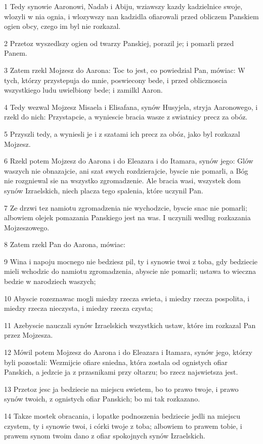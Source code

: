 \par 1 Tedy synowie Aaronowi, Nadab i Abiju, wziawszy kazdy kadzielnice swoje, wlozyli w nia ognia, i wlozywszy nan kadzidla ofiarowali przed obliczem Panskiem ogien obcy, czego im byl nie rozkazal.
\par 2 Przetoz wyszedlszy ogien od twarzy Panskiej, porazil je; i pomarli przed Panem.
\par 3 Zatem rzekl Mojzesz do Aarona: Toc to jest, co powiedzial Pan, mówiac: W tych, którzy przystepuja do mnie, poswiecony bede, i przed oblicznoscia wszystkiego ludu uwielbiony bede; i zamilkl Aaron.
\par 4 Tedy wezwal Mojzesz Misaela i Elisafana, synów Husyjela, stryja Aaronowego, i rzekl do nich: Przystapcie, a wyniescie bracia wasze z swiatnicy precz za obóz.
\par 5 Przyszli tedy, a wyniesli je i z szatami ich precz za obóz, jako byl rozkazal Mojzesz.
\par 6 Rzekl potem Mojzesz do Aarona i do Eleazara i do Itamara, synów jego: Glów waszych nie obnazajcie, ani szat swych rozdzierajcie, byscie nie pomarli, a Bóg nie rozgniewal sie na wszystko zgromadzenie. Ale bracia wasi, wszystek dom synów Izraelskich, niech placza tego spalenia, które uczynil Pan.
\par 7 Ze drzwi tez namiotu zgromadzenia nie wychodzcie, byscie snac nie pomarli; albowiem olejek pomazania Panskiego jest na was. I uczynili wedlug rozkazania Mojzeszowego.
\par 8 Zatem rzekl Pan do Aarona, mówiac:
\par 9 Wina i napoju mocnego nie bedziesz pil, ty i synowie twoi z toba, gdy bedziecie mieli wchodzic do namiotu zgromadzenia, abyscie nie pomarli; ustawa to wieczna bedzie w narodziech waszych;
\par 10 Abyscie rozeznawac mogli miedzy rzecza swieta, i miedzy rzecza pospolita, i miedzy rzecza nieczysta, i miedzy rzecza czysta;
\par 11 Azebyscie nauczali synów Izraelskich wszystkich ustaw, które im rozkazal Pan przez Mojzesza.
\par 12 Mówil potem Mojzesz do Aarona i do Eleazara i Itamara, synów jego, którzy byli pozostali: Wezmijcie ofiare sniedna, która zostala od ognistych ofiar Panskich, a jedzcie ja z przasnikami przy oltarzu; bo rzecz najswietsza jest.
\par 13 Przetoz jesc ja bedziecie na miejscu swietem, bo to prawo twoje, i prawo synów twoich, z ognistych ofiar Panskich; bo mi tak rozkazano.
\par 14 Takze mostek obracania, i lopatke podnoszenia bedziecie jedli na miejscu czystem, ty i synowie twoi, i córki twoje z toba; albowiem to prawem tobie, i prawem synom twoim dano z ofiar spokojnych synów Izraelskich.
